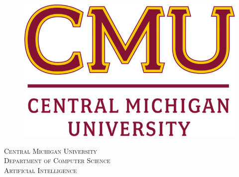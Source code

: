 \begin{titlepage}

\newcommand{\HRule}{\rule{\linewidth}{0.5mm}} %

\center %
 
\begin{figure}[b]
\centering
\includegraphics[scale=0.25]{logo.png}\\ %
 \end{figure}

\textsc{\LARGE Central Michigan University}\\[1.5cm] %
\textsc{\Large Department of Computer Science}\\[0.5cm] %
\textsc{\large Artificial Intelligence}\\[0.5cm] %



\end{titlepage}
